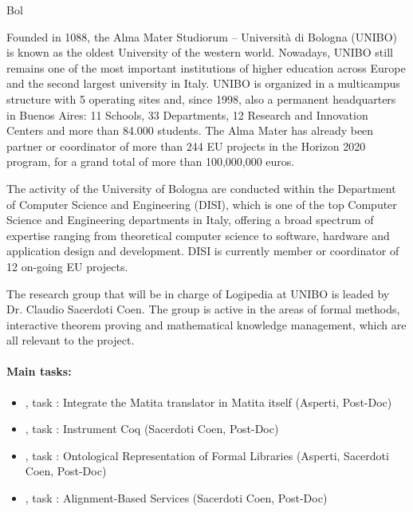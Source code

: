 \begin{sitedescription}{Bol}


Founded in 1088, the Alma Mater Studiorum – Università di Bologna (UNIBO) is known as the oldest University of the western world. Nowadays, UNIBO still remains one of the most important institutions of higher education across Europe and the second largest university in Italy. UNIBO is organized in a multicampus structure with 5 operating sites and, since 1998, also a permanent headquarters in Buenos Aires: 11 Schools, 33 Departments, 12 Research and Innovation Centers and more than 84.000 students. The Alma Mater has already been partner or coordinator of more than 244 EU projects in the Horizon 2020 program, for a grand total of more than 100,000,000 euros.

The activity of the University of Bologna are conducted within the Department of Computer Science and Engineering (DISI), which is one of the top Computer Science and Engineering departments in Italy, offering a broad spectrum of expertise ranging from theoretical computer science to software, hardware and application design and development. DISI is currently member or coordinator of 12 on-going EU projects.

The research group that will be in charge of Logipedia at UNIBO is leaded by Dr. Claudio Sacerdoti Coen. The group is active in the areas of formal methods, interactive theorem proving and mathematical knowledge management, which are all relevant to the project.

\paragraph{Main tasks:}

\begin{itemize}
\item {}, task : Integrate the Matita translator in Matita itself (Asperti, Post-Doc)
\item {}, task : Instrument Coq (Sacerdoti Coen, Post-Doc)
\item {}, task : Ontological Representation of Formal Libraries (Asperti, Sacerdoti Coen, Post-Doc)
\item {}, task : Alignment-Based Services (Sacerdoti Coen, Post-Doc)
\end{itemize}


\end{sitedescription}

